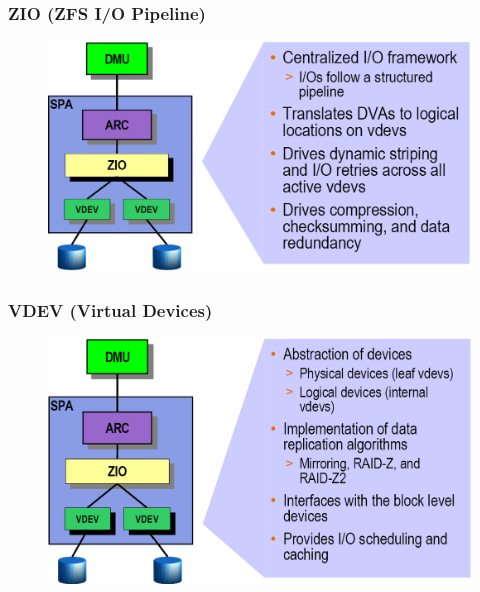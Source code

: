 % 
% 
\begin{frame}[fragile]
    \frametitle{ZIO (ZFS I/O Pipeline)}
    \begin{figure}
    \includegraphics[width=0.85\linewidth]{figs/ZFS-zio.png}
    \end{figure}
\end{frame}
% 
% 
\begin{frame}[fragile]
    \frametitle{VDEV (Virtual Devices)}
    \begin{figure}
    \includegraphics[width=0.8\linewidth]{figs/ZFS-vdev.png}
    \end{figure}
\end{frame}
% 
% 
